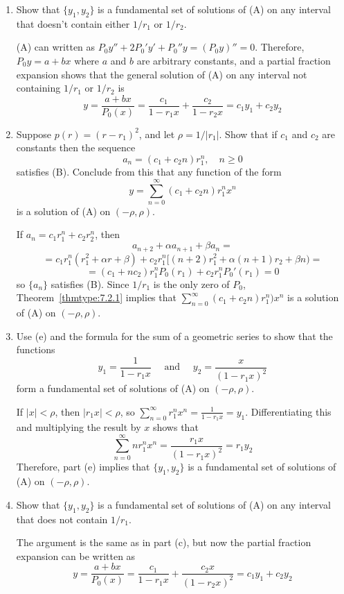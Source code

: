 \documentclass{ximera}
\begin{document}
\begin{problem}
\begin{enumerate}
\item %
Show that $\{y_1,y_2\}$ is
a fundamental set of solutions of (A) on any interval that
doesn't contain either $1/r_1$ or $1/r_2$.

\begin{solution}
    (A) can written as $P_0y''+2P_0'y'+P_0''y=(P_0y)''=0$.
Therefore,$P_0y=a+bx$ where $a$ and $b$ are arbitrary constants, and
 a partial fraction expansion shows that  the general solution of
(A)
on any interval not containing $1/r_1$ or $1/r_2$ is $$y=\frac{a+bx}{
P_0(x)}=\frac{c_1}{1-r_1x}+\frac{c_2}{1-r_2x}=c_1y_1+c_2y_2$$
\end{solution}

\item %
Suppose  $p(r)=(r-r_1)^2$, and let $\rho=1/|r_1|$.
Show that if   $c_1$  and $c_2$ are constants then the sequence
$$
a_n=(c_1+c_2n)r_1^n,\quad n\geq 0
$$
satisfies (B). Conclude from this that any function of the form
$$
y=\sum_{n=0}^\infty (c_1+c_2n)r_1^nx^n
$$
is a solution of (A) on $(-\rho,\rho)$.

\begin{solution}
    If $a_n=c_1r_1^n+c_2r_2^n$, then $$a_{n+2}+\alpha
a_{n+1}+\beta a_n=$$
$$=c_1r_1^n(r_1^2+\alpha
r+\beta)+c_2r_1^n[(n+2)r_1^2+\alpha(n+1)
r_2+\beta n)=$$
$$=(c_1+nc_2)r_1^nP_0(r_1)+c_2r_1^nP_0'(r_1)=0$$ so
$\{a_n\}$ satisfies (B). Since $1/r_1$ is the only  zero
of $P_0$, Theorem~\ref{thmtype:7.2.1} implies  that $\sum_{n=0}^\infty
(c_1+c_2n)r_1^n)x^n$ is a solution of (A) on $(-\rho,\rho)$.
\end{solution}

\item %
Use (e)  and the formula for the sum of a geometric series to show
that the functions
$$
y_1=\frac{1}{1-r_1x}\quad\text{ and }\quad y_2=\frac{x}{(1-r_1x)^2}
$$
form a fundamental set of solutions of (A) on $(-\rho,\rho)$.

\begin{solution}
    If $|x|<\rho$, then $|r_1x|<\rho$, so
$\sum_{n=0}^\infty r_1^nx^n=\frac{1}{1-r_1x}=y_1$.
Differentiating this and multiplying the result by $x$
shows that
$$\sum_{n=0}^\infty nr_1^nx^n=\frac{r_1x}{(1-r_1x)^2}=r_1y_2$$
Therefore,
part (e) implies that $\{y_1,y_2\}$ is a fundamental set of solutions
of (A) on $(-\rho,\rho)$.
\end{solution}

\item %
Show that $\{y_1,y_2\}$ is
 a fundamental set of solutions of (A) on any interval that
does not contain $1/r_1$.

\begin{solution}
    The argument is the same as in part (c), but now the
partial fraction expansion can be written as
 $$y=\frac{a+bx}{
P_0(x)}=\frac{c_1}{1-r_1x}+\frac{c_2x}{(1-r_2x)^2}=c_1y_1+c_2y_2$$
\end{solution}
\end{enumerate}
\end{problem}
\end{document}
